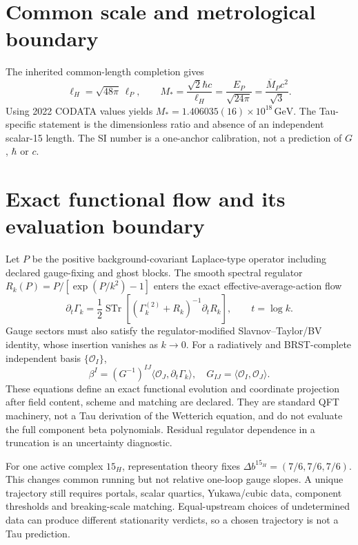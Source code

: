 \section{Common scale and metrological boundary}

The inherited common-length completion gives
\begin{equation}
\ell_H=\sqrt{48\pi}\,\ell_P,
\qquad
\boxed{M_*=\frac{\sqrt2\hbar c}{\ell_H}
=\frac{E_P}{\sqrt{24\pi}}
=\frac{\overline M_Pc^2}{\sqrt3}.}
\label{eq:commonscale}
\end{equation}
Using 2022 CODATA values \cite{CODATA2022} yields
$M_*=1.406035(16)\times10^{18}\,\mathrm{GeV}$. The Tau-specific statement is
the dimensionless ratio and absence of an independent scalar-15 length. The SI
number is a one-anchor calibration, not a prediction of $G$, $\hbar$ or $c$.

\section{Exact functional flow and its evaluation boundary}

Let $P$ be the positive background-covariant Laplace-type operator including
declared gauge-fixing and ghost blocks. The smooth spectral regulator
$R_k(P)=P/[\exp(P/k^2)-1]$ enters the exact effective-average-action flow
\cite{Wetterich1993}
\begin{equation}
\boxed{\partial_t\Gamma_k=\frac12\operatorname{STr}
[(\Gamma_k^{(2)}+R_k)^{-1}\partial_tR_k],\qquad t=\log k.}
\label{eq:wetterich}
\end{equation}
Gauge sectors must also satisfy the regulator-modified Slavnov--Taylor/BV
identity, whose insertion vanishes as $k\to0$. For a radiatively and
BRST-complete independent basis $\{\mathcal O_I\}$,
\begin{equation}
\boxed{\beta^I=(G^{-1})^{IJ}
\langle\mathcal O_J,\partial_t\Gamma_k\rangle,
\quad G_{IJ}=\langle\mathcal O_I,\mathcal O_J\rangle.}
\label{eq:betaprojection}
\end{equation}
These equations define an exact functional evolution and coordinate
projection after field content, scheme and matching are declared. They are
standard QFT machinery, not a Tau derivation of the Wetterich equation, and do
not evaluate the full component beta polynomials. Residual regulator
dependence in a truncation is an uncertainty diagnostic.

For one active complex $15_H$, representation theory fixes
$\Delta b^{15_H}=(7/6,7/6,7/6)$. This changes common running but not relative
one-loop gauge slopes. A unique trajectory still requires portals, scalar
quartics, Yukawa/cubic data, component thresholds and breaking-scale matching.
Equal-upstream choices of undetermined data can produce different
stationarity verdicts, so a chosen trajectory is not a Tau prediction.
